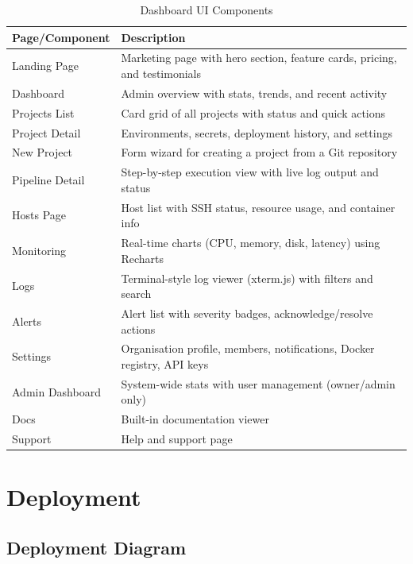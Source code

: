\documentclass[12pt,a4paper,twoside]{report}
\begin{document}
\begin{table}[H]
\centering
\caption{Dashboard UI Components}
\label{tab:ui-components}
\begin{tabularx}{\textwidth}{l|X}
\toprule
\textbf{Page/Component} & \textbf{Description} \\
\midrule
Landing Page & Marketing page with hero section, feature cards, pricing, and testimonials \\
Dashboard & Admin overview with stats, trends, and recent activity \\
Projects List & Card grid of all projects with status and quick actions \\
Project Detail & Environments, secrets, deployment history, and settings \\
New Project & Form wizard for creating a project from a Git repository \\
Pipeline Detail & Step-by-step execution view with live log output and status \\
Hosts Page & Host list with SSH status, resource usage, and container info \\
Monitoring & Real-time charts (CPU, memory, disk, latency) using Recharts \\
Logs & Terminal-style log viewer (xterm.js) with filters and search \\
Alerts & Alert list with severity badges, acknowledge/resolve actions \\
Settings & Organisation profile, members, notifications, Docker registry, API keys \\
Admin Dashboard & System-wide stats with user management (owner/admin only) \\
Docs & Built-in documentation viewer \\
Support & Help and support page \\
\bottomrule
\end{tabularx}
\end{table}


\chapter{Deployment}

\section{Deployment Diagram}
\end{document}
